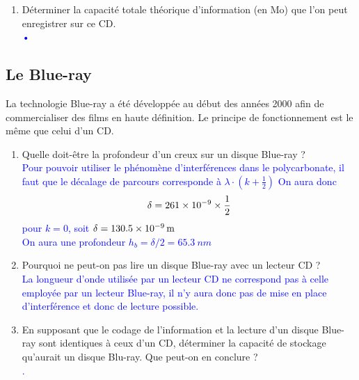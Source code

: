 \documentclass[a4paper,11pt,fleqn]{article}%
\begin{document}
\begin{enumerate}
\begin{enumerate}[label=\theenumi.\arabic*]
			\textcolor{blue}{Calcul de la période de l'onde : $$T = \dfrac{\lambda}{c}$$ $$T = \dfrac{\num{780E-9}}{\num{3E8}} = \SI{2,6E-15}{s}$$
			Comparaison entre le retard et la période : $$\dfrac{\delta t }{T} = \dfrac{\num{1,3E-15}}{\num{2,6E-15}} = \frac{1}{2}$$
			Le retard correspond à la moitié d'une longueur d'onde.}
			\item En déduire le type d'interférences (constructive ou destructive) entre l'onde réfléchie par un creux et celle réfléchie par un plat au niveau du capteur. La réponse s'appuiera sur un schéma.\\
			\textcolor{blue}{On constate que le rapport entre les périodes est de 1/2 ce qui correspond à des interférences destructives.}
			\item Dans ce cas, le signal reçu par le capteur est-il maximal ou minimal ? Commenter.\\
			\textcolor{blue}{Dans ce cas, le capteur reçoit un signal minimal car en opposition de phase.}
		\end{enumerate}
		
		\item Déterminer la capacité totale théorique d'information (en Mo) que l'on peut enregistrer sur ce CD.\\
		\textcolor{blue}{•}
	\end{enumerate}
\subsection{Le Blue-ray}
La technologie Blue-ray a été développée au début des années 2000 afin de commercialiser des films en haute définition. Le principe de fonctionnement est le même que celui d'un CD.
	\begin{enumerate}[resume]
		\item Quelle doit-être la profondeur d'un creux sur un disque Blue-ray ?\\
		\textcolor{blue}{Pour pouvoir utiliser le phénomène d'interférences dans le polycarbonate, il faut que le décalage de parcours corresponde à $\lambda \cdot (k + \frac{1}{2})$ On aura donc $$\delta = \num{261E-9} \times \frac{1}{2}$$ pour $k=0$, soit $\delta = \SI{130,5E-9}{m}$\\
		 On aura une profondeur $h_b = \delta /2 = \SI{65,3}{nm}$ }
		\item Pourquoi ne peut-on pas lire un disque Blue-ray avec un lecteur CD ?\\
		\textcolor{blue}{La longueur d'onde utilisée par un lecteur CD ne correspond pas à celle employée par un lecteur Blue-ray, il n'y aura donc pas de mise en place d'interférence et donc de lecture possible.}
		\item En supposant que le codage de l'information et la lecture d'un disque Blue-ray sont identiques à ceux d'un CD, déterminer la capacité de stockage qu'aurait un disque Blu-ray. Que peut-on en conclure ?\\
		\textcolor{blue}{.}
	\end{enumerate}
\end{document}
